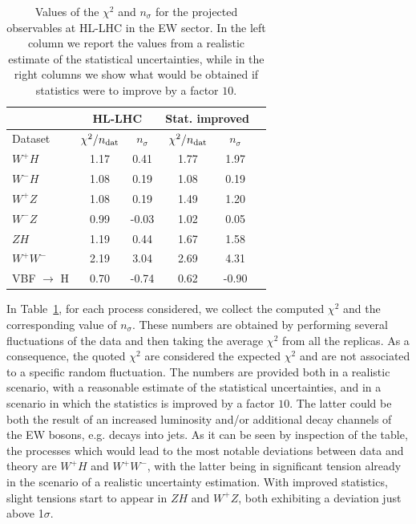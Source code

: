 \documentclass[withindex,glossary]{cam-thesis}
\begin{document}
%
\begin{table}[H]
        \small
        \centering
        \begin{tabular}{l|c|c|c|c|c|}
                \toprule
       & \multicolumn{2}{c}{HL-LHC} & \multicolumn{2}{c}{Stat. improved}\\
          \midrule
       Dataset  & $\chi^2/n_{\rm dat}$ &  $n_\sigma$ & $\chi^2/n_{\rm dat}$ & $n_\sigma$ \\
          \midrule
 $W^+ H$         & 1.17 & 0.41 & 1.77 & 1.97 \\
 $W^- H$         & 1.08 & 0.19 & 1.08 & 0.19 \\
 $W^+ Z$         & 1.08 & 0.19 & 1.49 & 1.20\\
 $W^- Z$         & 0.99 & -0.03 & 1.02 & 0.05\\
 $Z H$           & 1.19 & 0.44 & 1.67 & 1.58\\
 $W^+ W^-$       & 2.19 & 3.04 & 2.69 & 4.31\\
 VBF $\to$ H        & 0.70 & -0.74 & 0.62 & -0.90\\
                \bottomrule
        \end{tabular}
        \caption{Values of the \(\chi^2\) and $n_\sigma$ for the projected observables at HL-LHC in the EW sector. In the left column we report the values from a realistic estimate of the statistical uncertainties, while in the right columns we show what would be obtained if statistics were to improve by a factor $10$. \label{tab:chi2_hllhc}}
\end{table}
%
In Table~\ref{tab:chi2_hllhc}, for each process considered, we collect the computed $\chi^2$ and the corresponding value of $n_\sigma$. These numbers are obtained by performing several fluctuations of the data and then taking the average $\chi^2$ from all the replicas. As a consequence, the quoted $\chi^2$ are considered the expected $\chi^2$ and are not associated to a specific random fluctuation. The numbers are provided both in a realistic scenario, with a reasonable estimate of the statistical uncertainties, and in a scenario in which the statistics is improved by a factor $10$. 
The latter could be both the result of an increased luminosity and/or additional decay channels of the EW bosons, e.g. decays into jets. 
As it can be seen by inspection of the table, the processes which would lead to the most notable deviations between data and theory are $W^+ H$ and $W^+ W^-$, with the latter being in significant tension already in the scenario of a realistic uncertainty estimation. With improved statistics, slight tensions start to appear in $Z H$ and $W^+ Z$, both exhibiting a deviation just above 1$\sigma$.
\end{document}
